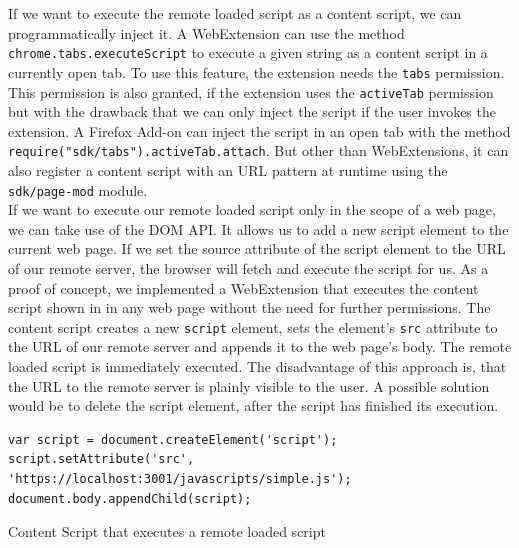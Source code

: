			If we want to execute the remote loaded script as a content script, we can programmatically inject it. A WebExtension can use the method \texttt{chrome.tabs.executeScript} to execute a given string as a content script in a currently open tab. To use this feature, the extension needs the \texttt{tabs} permission. This permission is also granted, if the extension uses the \texttt{activeTab} permission but with the drawback that we can only inject the script if the user invokes the extension. A Firefox Add-on can inject the script in an open tab with the method \texttt{require("sdk/tabs").activeTab.attach}. But other than WebExtensions, it can also register a content script with an URL pattern at runtime using the \texttt{sdk/page-mod} module. \\
			
			If we want to execute our remote loaded script only in the scope of a web page, we can take use of the DOM API. It allows us to add a new script element to the current web page. If we set the source attribute of the script element to the URL of our remote server, the browser will fetch and execute the script for us. As a proof of concept, we  implemented a WebExtension that executes the content script shown in  in any web page without the need for further permissions. The content script creates a new \texttt{script} element, sets the element's \texttt{src} attribute to the URL of our remote server and appends it to the web page's body. The remote loaded script is immediately executed. The disadvantage of this approach is, that the URL to the remote server is plainly visible to the user. A possible solution would be to delete the script element, after the script has finished its execution.
			
			\begin{code}
				\begin{lstlisting}	
var script = document.createElement('script');
script.setAttribute('src', 'https://localhost:3001/javascripts/simple.js');
document.body.appendChild(script);
				\end{lstlisting}
				\caption{Content Script that executes a remote loaded script}
				\label{contentScriptRemotLoad}
			\end{code}
		
	
